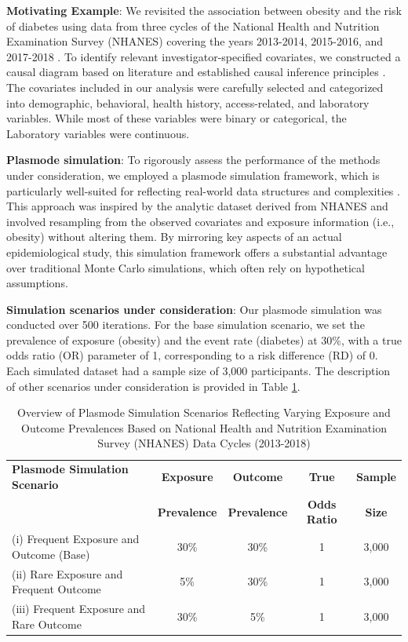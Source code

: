 \documentclass[sn-vancouver,Numbered,lineno,pdflatex]{sn-jnl}
\begin{document}
\textbf{Motivating Example}: We revisited the association between
obesity and the risk of diabetes using data from three cycles of the
National Health and Nutrition Examination Survey (NHANES) covering the
years 2013-2014, 2015-2016, and 2017-2018 \citep{karim2024high}. To
identify relevant investigator-specified covariates, we constructed a
causal diagram based on literature
\citep{saydah2014trends, liu2013association, kabadi2012joint, ostchega2012abdominal}
and established causal inference principles \citep{greenland1999causal}.
The covariates included in our analysis were carefully selected and
categorized into demographic, behavioral, health history,
access-related, and laboratory variables. While most of these variables
were binary or categorical, the Laboratory variables were continuous.

\textbf{Plasmode simulation}: To rigorously assess the performance of
the methods under consideration, we employed a plasmode simulation
framework, which is particularly well-suited for reflecting real-world
data structures and complexities \citep{franklin2014plasmode}. This
approach was inspired by the analytic dataset derived from NHANES and
involved resampling from the observed covariates and exposure
information (i.e., obesity) without altering them. By mirroring key
aspects of an actual epidemiological study, this simulation framework
offers a substantial advantage over traditional Monte Carlo simulations,
which often rely on hypothetical assumptions.

\textbf{Simulation scenarios under consideration}: Our plasmode
simulation was conducted over 500 iterations. For the base simulation
scenario, we set the prevalence of exposure (obesity) and the event rate
(diabetes) at 30\%, with a true odds ratio (OR) parameter of 1,
corresponding to a risk difference (RD) of 0. Each simulated dataset had
a sample size of 3,000 participants. The description of other scenarios
under consideration is provided in Table \ref{table:scenarios}.

\begin{table}[ht]
\centering
\caption{Overview of Plasmode Simulation Scenarios Reflecting Varying Exposure and Outcome Prevalences Based on National Health and Nutrition Examination Survey (NHANES) Data Cycles (2013-2018)}
\label{table:scenarios}
\begin{tabular}{lcccc}
  \toprule
  \textbf{Plasmode Simulation Scenario} & \textbf{Exposure} & \textbf{Outcome} & \textbf{True} & \textbf{Sample}\\
  \textbf{} & \textbf{Prevalence} & \textbf{Prevalence} & \textbf{Odds Ratio} & \textbf{Size}\\
  \midrule
  (i) Frequent Exposure and Outcome (Base) & 30\% & 30\% & 1 & 3,000 \\
  (ii) Rare Exposure and Frequent Outcome & 5\% & 30\% & 1 & 3,000 \\
  (iii) Frequent Exposure and Rare Outcome & 30\% & 5\% & 1 & 3,000 \\
  \bottomrule
\end{tabular}
\end{table}
\end{document}
